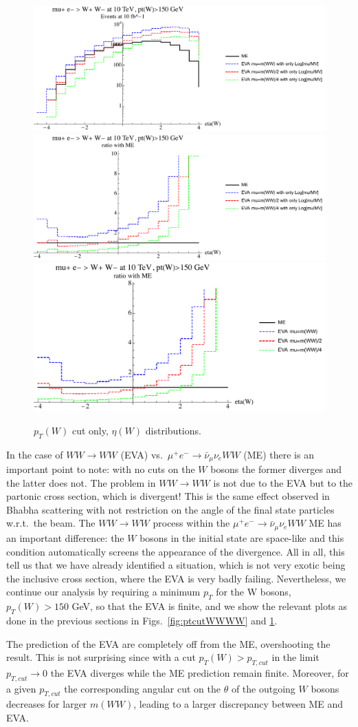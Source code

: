 \documentclass[a4paper,11pt]{article}
\begin{document}
\begin{figure}[!t]
\includegraphics[width=0.46\linewidth]{Notebooks/PlotDistr/WW_WW/10TeVolnlyptcut/plotetaW.pdf}
\includegraphics[width=0.46\linewidth]{Notebooks/PlotDistr/WW_WW/10TeVolnlyptcut/plotetaWratio1.pdf}
\includegraphics[width=0.46\linewidth]{Notebooks/PlotDistr/WW_WW/10TeVolnlyptcut/plotetaWratio2.pdf}
\caption{$p_T(W)$ cut only, $\eta(W)$ distributions. \label{fig:ptcutWWWW2}}
\end{figure}


In the case of $WW \to WW$ (EVA) vs.~$\mu^+e^-\to\bar \nu_\mu \nu_e WW$ (ME) there is an important point to note: with no cuts on the $W$ bosons the former diverges and the latter does not. The problem in $WW\to WW$ is not due to the EVA but to the partonic cross section, which is divergent! This is the same effect observed in Bhabha scattering with not restriction on the angle of the final state particles w.r.t.~the beam. The $WW\to WW$ process within the $\mu^+e^-\to\bar \nu_\mu \nu_e WW$ ME has an important difference: the $W$ bosons in the initial state are space-like and this condition automatically screens the appearance of the divergence. All in all, this tell us that we have already identified a situation, which is not very exotic being the inclusive cross section, where the EVA is very badly failing. Nevertheless, we continue our analysis by requiring a minimum $p_T$ for the W bosons, $p_T(W)>150$ GeV, so that the EVA is finite, and we show the relevant plots as done in the previous sections in Figs.~\ref{fig:ptcutWWWW} and \ref{fig:ptcutWWWW2}. 

The prediction of the EVA are completely off from the ME, overshooting the result. This is not surprising since with a cut  $p_T(W)>p_{T,cut}$ in the limit $p_{T,cut}\to 0$ the EVA diverges while the ME prediction remain finite. Moreover, for a given $p_{T,cut}$ the corresponding angular cut on the $\theta$ of the outgoing $W$ bosons decreases for larger $m(WW)$, leading to a larger discrepancy between ME and EVA. 
\end{document}

